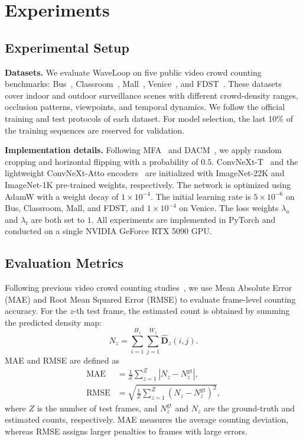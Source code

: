 \documentclass[lettersize,journal]{IEEEtran}
\begin{document}
\section{Experiments}
\subsection{Experimental Setup}
\label{ID}
\textbf{Datasets.}
We evaluate WaveLoop on five public video crowd counting benchmarks: Bus~\cite{ling2023motional}, Classroom~\cite{ling2023motional}, Mall~\cite{chen2012feature}, Venice~\cite{liu2019context}, and FDST~\cite{fang2019locality}. These datasets cover indoor and outdoor surveillance scenes with different crowd-density ranges, occlusion patterns, viewpoints, and temporal dynamics. We follow the official training and test protocols of each dataset. For model selection, the last 10\% of the training sequences are reserved for validation.

\textbf{Implementation details.}
Following MFA~\cite{ling2023motional} and DACM~\cite{ling2025dual}, we apply random cropping and horizontal flipping with a probability of $0.5$. ConvNeXt-T~\cite{liu2022convnet} and the lightweight ConvNeXt-Atto encoders~\cite{woo2023convnext} are initialized with ImageNet-22K and ImageNet-1K pre-trained weights, respectively. The network is optimized using AdamW with a weight decay of $1\times10^{-4}$. The initial learning rate is $5\times10^{-6}$ on Bus, Classroom, Mall, and FDST, and $1\times10^{-4}$ on Venice. The loss weights $\lambda_a$ and $\lambda_t$ are both set to $1$. All experiments are implemented in PyTorch and conducted on a single NVIDIA GeForce RTX 5090 GPU.

\subsection{Evaluation Metrics}
Following previous video crowd counting studies~\cite{wu2022spatial,dong2022clrnet,hou2023frame}, we use Mean Absolute Error (MAE) and Root Mean Squared Error (RMSE) to evaluate frame-level counting accuracy. For the $z$-th test frame, the estimated count is obtained by summing the predicted density map:
\begin{equation}
N_z=\sum_{i=1}^{H_z}\sum_{j=1}^{W_z}\hat{\mathbf D}_z(i,j).
\end{equation}
MAE and RMSE are defined as
\begin{equation}
\begin{aligned}
\mathrm{MAE}
&=
\frac{1}{Z}\sum_{z=1}^{Z}\left|N_z-N_z^{\mathrm{gt}}\right|,\\
\mathrm{RMSE}
&=
\sqrt{\frac{1}{Z}\sum_{z=1}^{Z}\left(N_z-N_z^{\mathrm{gt}}\right)^2},
\end{aligned}
\label{eq:count_metrics}
\end{equation}
where $Z$ is the number of test frames, and $N_z^{\mathrm{gt}}$ and $N_z$ are the ground-truth and estimated counts, respectively. MAE measures the average counting deviation, whereas RMSE assigns larger penalties to frames with large errors.
\end{document}
